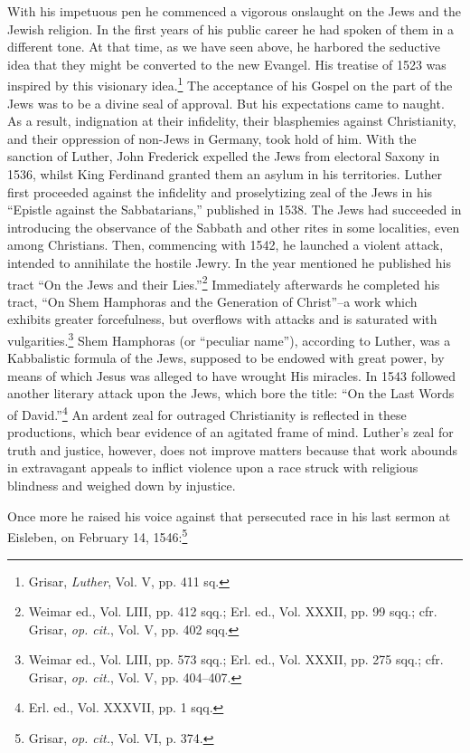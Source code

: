 With his impetuous pen he commenced a vigorous onslaught on
the Jews and the Jewish religion. In the first years of his public
career he had spoken of them in a different tone. At that time, as we
have seen above, he harbored the seductive idea that they might be
converted to the new Evangel. His treatise of 1523 was inspired by
this visionary idea.\footnote{Grisar, \textit{Luther}, Vol. V, pp. 411 sq.}
The acceptance of his Gospel on the part of the
Jews was to be a divine seal of approval. But his expectations came
to naught. As a result, indignation at their infidelity, their blasphemies
against Christianity, and their oppression of non-Jews in
Germany, took hold of him. With the sanction of Luther, John
Frederick expelled the Jews from electoral Saxony in 1536, whilst
King Ferdinand granted them an asylum in his territories.
Luther first proceeded against the infidelity and proselytizing zeal
of the Jews in his “Epistle against the Sabbatarians,” published in
1538. The Jews had succeeded in introducing the observance of the
Sabbath and other rites in some localities, even among Christians.
Then, commencing with 1542, he launched a violent attack, intended
to annihilate the hostile Jewry. In the year mentioned he published
his tract “On the Jews and their Lies.”\footnote
{Weimar ed., Vol. LIII, pp. 412 sqq.; Erl. ed., Vol. XXXII, pp. 99 sqq.; cfr. Grisar, \textit{op.
cit.}, Vol. V, pp. 402 sqq.}
Immediately afterwards he
completed his tract, “On Shem Hamphoras and the Generation of
Christ”--a work which exhibits greater forcefulness, but overflows
with attacks and is saturated with vulgarities.\footnote
{Weimar ed., Vol. LIII, pp. 573 sqq.; Erl. ed., Vol. XXXII, pp. 275 sqq.; cfr. Grisar,
\textit{op. cit.}, Vol. V, pp. 404--407.}
Shem Hamphoras (or
“peculiar name”), according to Luther, was a Kabbalistic formula of the
Jews, supposed to be endowed with great power, by means of which Jesus
was alleged to have wrought His miracles. In 1543 followed
another literary attack upon the Jews, which bore the title: “On the
Last Words of David.”\footnote{Erl. ed., Vol. XXXVII, pp. 1 sqq.}
An ardent zeal for outraged Christianity is reflected
in these productions, which bear evidence of an agitated frame of
mind. Luther’s zeal for truth and justice, however, does not improve
matters because that work abounds in extravagant appeals to inflict
violence upon a race struck with religious blindness and weighed
down by injustice.

Once more he raised his voice against that persecuted race in his last
sermon at Eisleben, on February 14, 1546:\footnote{Grisar, \textit{op. cit.}, Vol. VI, p. 374.}


